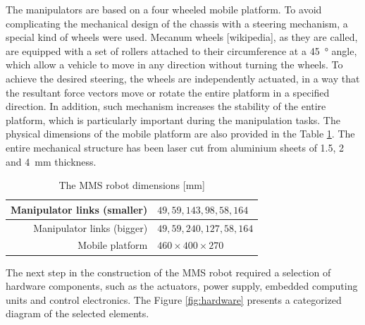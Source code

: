 The manipulators are based on a four wheeled mobile platform. To avoid complicating the mechanical design of the chassis with a steering mechanism, a special kind of wheels were used. Mecanum wheels [wikipedia], as they are called, are equipped with a set of rollers attached to their circumference at a \SI{45}{\degree} angle, which allow a vehicle to move in any direction without turning the wheels. To achieve the desired steering, the wheels are independently actuated, in a way that the resultant force vectors move or rotate the entire platform in a specified direction. In addition, such mechanism increases the stability of the entire platform, which is particularly important during the manipulation tasks. The physical dimensions of the mobile platform are also provided in the Table \ref{tab:dimensions}. The entire mechanical structure has been laser cut from aluminium sheets of \SI{1.5}{}, \SI{2}{} and \SI{4}{\milli\meter} thickness.

\begin{table}[H]

\begin{center}

\begin{tabular}{r||l}
\hline
Manipulator links  (smaller)    & $49,59,143,98,58,164$ \\

\hline
Manipulator links  (bigger)        & $49,59,240,127,58,164$ \\

\hline
Mobile platform & $460\times 400\times 270$ \\

\hline
\end{tabular}
\caption{The MMS robot dimensions [mm]}
\label{tab:dimensions}
\end{center}
\end{table}


The next step in the construction of the MMS robot required a selection of hardware components, such as the actuators, power supply, embedded computing units and control electronics. The Figure \ref{fig:hardware} presents a categorized diagram of the selected elements. 

